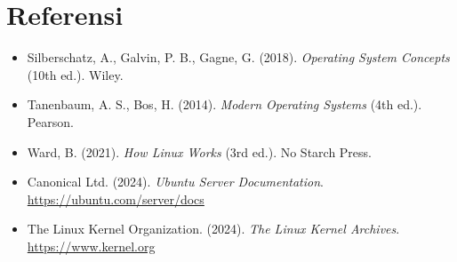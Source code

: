 \section{Referensi}
\label{sec:referensi}

\begin{itemize}
    \item Silberschatz, A., Galvin, P. B., Gagne, G. (2018). \textit{Operating System
    Concepts} (10th ed.). Wiley.

    \item Tanenbaum, A. S., Bos, H. (2014). \textit{Modern Operating Systems} (4th
    ed.). Pearson.

    \item Ward, B. (2021). \textit{How Linux Works} (3rd ed.). No Starch Press.

    \item Canonical Ltd. (2024). \textit{Ubuntu Server Documentation}.
    \url{https://ubuntu.com/server/docs}

    \item The Linux Kernel Organization. (2024). \textit{The Linux Kernel Archives}.
    \url{https://www.kernel.org}
\end{itemize}
